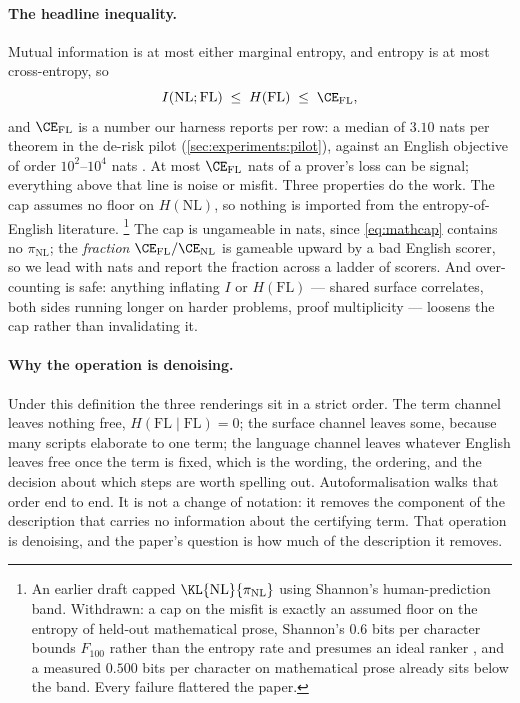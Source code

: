 \paragraph{The headline inequality.}
Mutual information is at most either marginal entropy, and entropy is at most
cross-entropy, so
\begin{equation}
\label{eq:mathcap}
  I(\mathrm{NL};\mathrm{FL}) \;\le\; H(\mathrm{FL}) \;\le\; \CE_{\mathrm{FL}},
\end{equation}
and \(\CE_{\mathrm{FL}}\) is a number our harness reports per row:
a median of \(3.10\) nats per theorem in the de-risk pilot
(\cref{sec:experiments:pilot}), against an English objective of order
\(10^{2}\)--\(10^{4}\) nats \citep{shannon1951prediction,
deletang2024compression}.
At most \(\CE_{\mathrm{FL}}\) nats of a prover's loss can be signal;
everything above that line is noise or misfit.
Three properties do the work.
The cap assumes no floor on \(H(\mathrm{NL})\), so nothing is imported from the
entropy-of-English literature.%
\footnote{An earlier draft capped \(\KL{\mathrm{NL}}{\pi_{\mathrm{NL}}}\) using
Shannon's human-prediction band.
Withdrawn: a cap on the misfit is exactly an assumed floor on the entropy of
held-out mathematical prose, Shannon's \(0.6\) bits per character bounds
\(F_{100}\) rather than the entropy rate and presumes an ideal ranker
\citep{shannon1951prediction, coverking1978gambling}, and a measured \(0.500\)
bits per character on mathematical prose \citep{huang2024compression} already
sits below the band.
Every failure flattered the paper.}
The cap is ungameable in nats, since \cref{eq:mathcap} contains no
\(\pi_{\mathrm{NL}}\);
the \emph{fraction} \(\CE_{\mathrm{FL}}/\CE_{\mathrm{NL}}\) is gameable upward
by a bad English scorer, so we lead with nats and report the fraction across a
ladder of scorers.
And over-counting is safe:
anything inflating \(I\) or \(H(\mathrm{FL})\) --- shared surface correlates,
both sides running longer on harder problems, proof multiplicity --- loosens the
cap rather than invalidating it.

\paragraph{Why the operation is denoising.}
Under this definition the three renderings sit in a strict order.
The term channel leaves nothing free, \(H(\mathrm{FL}\mid\mathrm{FL}) = 0\);
the surface channel leaves some, because many scripts elaborate to one term;
the language channel leaves whatever English leaves free once the term is fixed,
which is the wording, the ordering, and the decision about which steps are worth
spelling out.
Autoformalisation walks that order end to end.
It is not a change of notation:
it removes the component of the description that carries no information about
the certifying term.
That operation is denoising, and the paper's question is how much of the
description it removes.

